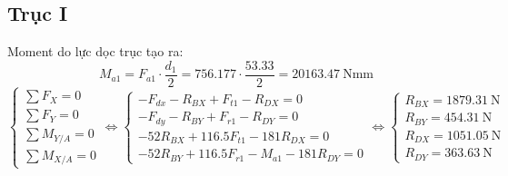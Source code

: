 \subsection{Trục I}
Moment do lực dọc trục tạo ra:
\begin{equation}
    M_{a1} = F_{a1} \cdot \frac{d_1}{2} 
           = 756.177 \cdot \frac{53.33}{2} 
           = 20163.47\ \text{Nmm}
\end{equation}
\[
    \left\{
    \begin{array}{l}
        \sum F_X = 0 \\
        \sum F_Y = 0 \\
        \sum M_{Y/A} = 0 \\
        \sum M_{X/A} = 0
    \end{array}
    \right.
    \Leftrightarrow
    \left\{
    \begin{array}{l}
        -F_{dx} - R_{BX} + F_{t1} - R_{DX} = 0 \\
        -F_{dy} - R_{BY} + F_{r1} - R_{DY} = 0  \\
        -52 R_{BX} + 116.5 F_{t1} - 181R_{DX} = 0 \\
        -52 R_{BY} + 116.5 F_{r1} - M_{a1} - 181 R_{DY} = 0
    \end{array}
    \right.
    \Leftrightarrow
    \left\{
    \begin{array}{l}
        R_{BX} = 1879.31\ \text{N} \\
        R_{BY} = 454.31\ \text{N} \\
        R_{DX} = 1051.05\ \text{N} \\
        R_{DY} = 363.63\ \text{N}
    \end{array}
    \right.
\]
